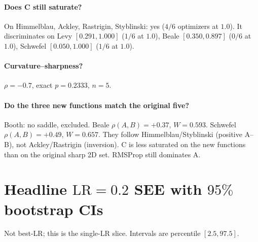 \documentclass[11pt]{article}
\begin{document}
\paragraph{Does C still saturate?}
On Himmelblau, Ackley, Rastrigin, Styblinski: yes ($4/6$ optimizers at $1.0$).
It discriminates on Levy $[0.291,1.000]$ ($1/6$ at $1.0$),
Beale $[0.350,0.897]$ ($0/6$ at $1.0$),
Schwefel $[0.050,1.000]$ ($1/6$ at $1.0$).

\paragraph{Curvature--sharpness?}
$\rho=-0.7$, exact $p=0.2333$, $n=5$.

\paragraph{Do the three new functions match the original five?}
Booth: no saddle, excluded. Beale $\rho(A,B)=+0.37$, $W=0.593$.
Schwefel $\rho(A,B)=+0.49$, $W=0.657$.
They follow Himmelblau/Styblinski (positive A--B), not Ackley/Rastrigin
(inversion). C is less saturated on the new functions than on the original
sharp 2D set. RMSProp still dominates A.

\section{Headline $\mathrm{LR}=0.2$ SEE with $95\%$ bootstrap CIs}

Not best-LR; this is the single-LR slice. Intervals are percentile $[2.5,97.5]$.
\end{document}
